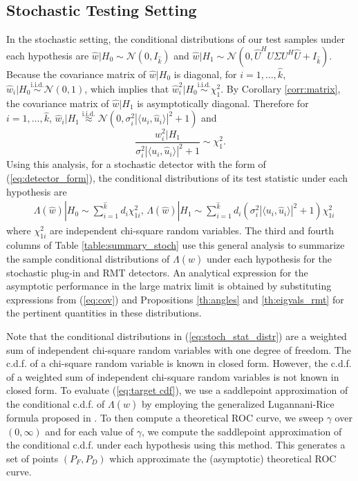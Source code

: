 \subsection{Stochastic Testing Setting}\label{sec:roc_stoch}
In the stochastic setting, the conditional distributions of our test samples under each hypothesis are $\widehat{w}|H_0\sim\mathcal{N}(0,I_{\widehat{k}})$ and $\widehat{w}|H_1\sim\mathcal{N}(0,\widehat{U}^HU\Sigma U^H\widehat{U}+I_{\widehat{k}})$. Because the covariance matrix of $\widehat{w}|H_0$ is diagonal, for $i=1,\dots,\widehat{k}$, $\widehat{w}_i|H_0\overset{\text{i.i.d}.}{\sim}\mathcal{N}(0,1)$, which implies that $\widehat{w}_i^2|H_0\overset{\text{i.i.d.}}{\sim}\chi_1^2$. By Corollary \ref{corr:matrix}, the covariance matrix of $\widehat{w}|H_1$ is asymptotically diagonal. Therefore for $i=1,\dots,\widehat{k}$, $\widehat{w}_i|H_1\overset{\text{i.i.d.}}{\approx}\mathcal{N}(0,\sigma^2_i|\langle u_i,\widehat{u}_i\rangle|^2+1)$ and
\begin{equation*}
\frac{w_i^2|H_1}{\sigma^2_i|\langle u_i,\widehat{u}_i\rangle|^2+1}\sim\chi_1^2.
\end{equation*}
Using this analysis, for a stochastic detector with the form of (\ref{eq:detector_form}), the conditional distributions of its test statistic under each hypothesis are
\small\begin{equation}\label{eq:stoch_stat_distr}
\begin{aligned}
&\Lambda(\widehat{w})|H_0 \sim \sum_{i=1}^{\widehat{k}} d_i\chi_{1i}^2 ,\,\Lambda(\widehat{w})|H_1\sim\sum_{i=1}^{\widehat{k}}d_i(\sigma^2_i|\langle u_i,\widehat{u}_i\rangle|^2+1)\chi_{1i}^2
\end{aligned}
\end{equation}\normalsize
where $\chi_{1i}^2$ are independent chi-square random variables. The third and fourth columns of Table \ref{table:summary_stoch} use this general analysis to summarize the sample conditional distributions of $\Lambda(\widehat{w})$ under each hypothesis for the stochastic plug-in and RMT detectors.  An analytical expression for the asymptotic performance in the large matrix limit  is obtained by substituting expressions from (\ref{eq:cov}) and Propositions \ref{th:angles} and \ref{th:eigvals_rmt} for the pertinent quantities in these distributions.

Note that the conditional distributions in (\ref{eq:stoch_stat_distr}) are a weighted sum of independent chi-square random variables with one degree of freedom. The c.d.f. of a chi-square random variable is known in closed form. However, the c.d.f. of a weighted sum of independent chi-square random variables is not known in closed form. To evaluate (\ref{eq:target cdf}), we use a saddlepoint approximation of the conditional c.d.f. of $\Lambda(\widehat{w})$ by employing the generalized Lugannani-Rice formula proposed in \cite{wood1993saddlepoint}. To then compute a theoretical ROC curve, we sweep $\gamma$ over $(0,\infty)$ and for each value of $\gamma$, we compute the saddlepoint approximation of the conditional c.d.f. under each hypothesis using this method. This generates a set of points $(P_F,P_D)$ which approximate the (asymptotic) theoretical ROC curve.

